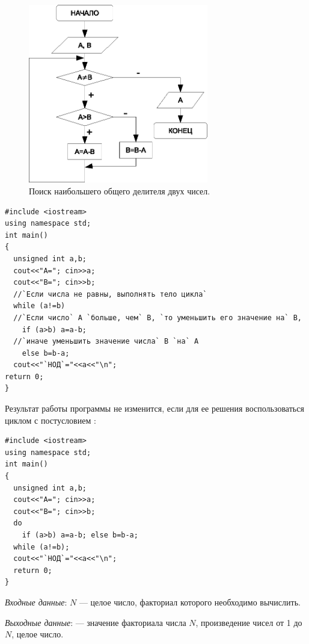 \begin{figure}[htb]
\begin{center}
\includegraphics[width=0.7\textwidth]{img/ris_3_28}
\caption{Поиск наибольшего общего делителя двух чисел.}
\label{ch03:refDrawing27}
\end{center}
\end{figure}

\begin{lstlisting}
#include <iostream>
using namespace std;
int main()
{
  unsigned int a,b;
  cout<<"A="; cin>>a;
  cout<<"B="; cin>>b;
  //`Если числа не равны, выполнять тело цикла`
  while (a!=b)
  //`Если число` A `больше, чем` B, `то уменьшить его значение на` B,
    if (a>b) a=a-b;
  //`иначе уменьшить значение числа` B `на` A
    else b=b-a;
  cout<<"`НОД`="<<a<<"\n";
return 0;
}
\end{lstlisting}

Результат работы программы не изменится, если для ее решения воспользоваться циклом с постусловием
:

\begin{lstlisting}
#include <iostream>
using namespace std;
int main()
{
  unsigned int a,b;
  cout<<"A="; cin>>a;
  cout<<"B="; cin>>b;
  do
    if (a>b) a=a-b; else b=b-a;
  while (a!=b);
  cout<<"`НОД`="<<a<<"\n";
  return 0;
}
\end{lstlisting}


\emph{Входные данные}: $N$ --- целое число, факториал которого необходимо вычислить.

\emph{Выходные данные}:  --- значение факториала числа $N$,
произведение чисел от 1 до $N$, целое число.

